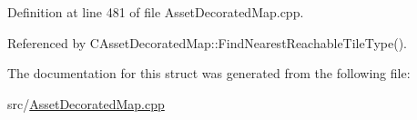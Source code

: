 Definition at line 481 of file Asset\+Decorated\+Map.\+cpp.



Referenced by C\+Asset\+Decorated\+Map\+::\+Find\+Nearest\+Reachable\+Tile\+Type().



The documentation for this struct was generated from the following file\+:\begin{DoxyCompactItemize}
\item 
src/\hyperlink{AssetDecoratedMap_8cpp}{Asset\+Decorated\+Map.\+cpp}\end{DoxyCompactItemize}
